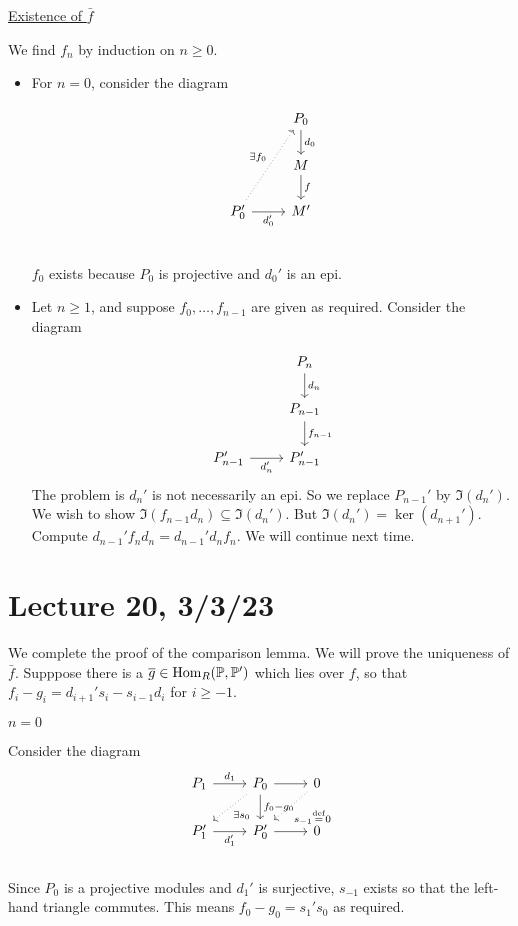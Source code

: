\documentclass[x11names,reqno,14pt]{extarticle}
\newcommand{\barf}{\bar{f}}
\begin{document}
\proof

\underline{Existence of $\barf$} 

We find $f_n$ by induction on $n \geq 0$. 

\begin{itemize}

\item For $n = 0$, consider the diagram 

\[
\begin{tikzcd}
& P_0 \ar[d, "d_0"] \\
& M \ar[d, "f"] \\
P'_0 \ar[r, "d_0'"']\ar[uur, dotted, "\exists f_0"] & M' \\
\end{tikzcd}
\]

$f_0$ exists because $P_0$ is projective and $d_0'$ is an epi. 

\item Let $n \geq 1$, and suppose $f_0, \dots, f_{n - 1}$ are given as required. Consider the diagram 

\[
\begin{tikzcd}
&P_n \ar[d, "d_n"] \\
&P_{n - 1} \ar[d, "f_{n - 1}"] \\
P_{n - 1}'\ar[r, "d_n'"'] &P_{n - 1}' 
\end{tikzcd}
\]
The problem is $d_n'$ is not necessarily an epi. So we replace $P_{n - 1}'$ by $\Im(d_n')$. We wish to show $\Im(f_{n - 1}d_n) \subseteq \Im(d_n')$. But $\Im(d_n') = \ker(d_{n + 1}')$. Compute $d_{n - 1}'f_nd_n = d_{n - 1}'d_nf_n$. We will continue next time.

\end{itemize}

\section*{Lecture 20, 3/3/23}

We complete the proof of the comparison lemma. We will prove the uniqueness of $\barf$. Supppose there is a $\overline{g}\in{\mathrm{Hom}}_R(\mathbb{P},\mathbb{P}')$ which lies over $f$, so that $f_i - g_i = d_{i + 1}'s_i - s_{i - 1}d_i$ for $i \geq -1$. 

\underline{$n = 0$}

Consider the diagram 
\[
\begin{tikzcd}
P_1 \ar[r, "d_1"] & P_0 \ar[dl, dotted, "\exists s_0"]\ar[r] \ar[d, "f_0 - g_0"]& 0 \ar[dl, dotted, "s_{-1} \eqdef 0"]\\
P_1'\ar[r, "d_1'"'] & P_0' \ar[r] & 0 \\
\end{tikzcd}
\]
Since $P_0$ is a projective modules and $d_1'$ is surjective, $s_{-1}$ exists so that the left-hand triangle commutes. This means $f_0 - g_0 = s_1's_0$ as required.
\end{document}
